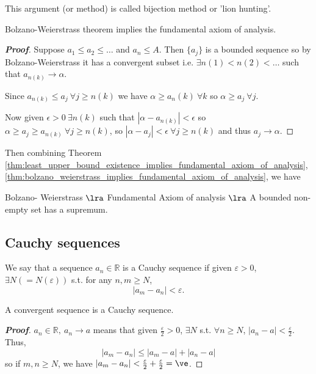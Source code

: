 \begin{remark}
This argument (or method) is called bijection method or 'lion hunting'.
\end{remark}

\begin{theorem}\label{thm:bolzano_weierstrass_implies_fundamental_axiom_of_analysis}
Bolzano-Weierstrass theorem implies the fundamental axiom of analysis.
\end{theorem}

\begin{proof}[\bf Proof]
Suppose $a_1 \leq a_2 \leq \ldots$ and $a_n \leq A$. Then $\{a_j\}$ is a bounded sequence so by Bolzano-Weierstrass it has a convergent subset i.e. $\exists n(1) < n(2) < \ldots$ such that $a_{n(k)} \rightarrow \alpha$.

Since $a_{n(k)} \leq a_j \ \forall j \geq n(k)$ we have $\alpha \geq a_n(k) \ \forall k$ so $\alpha \geq a_j \ \forall j$.

Now given $\epsilon > 0 \ \exists n(k)$ such that $|\alpha - a_{n(k)}| < \epsilon$ so $\alpha \geq a_j \geq a_{n(k)} \ \forall j \geq n(k)$, so $|\alpha - a_j| < \epsilon \ \forall j \geq n(k)$ and thus $a_j \rightarrow \alpha$.
\end{proof}

Then combining Theorem \ref{thm:least_upper_bound_existence_implies_fundamental_axiom_of_analysis}, \ref{thm:bolzano_weierstrass_implies_fundamental_axiom_of_analysis}, we have
\begin{theorem}
Bolzano- Weierstrass $\lra$ Fundamental Axiom of analysis $\lra$ A bounded non-empty set has a supremum.
\end{theorem}


\subsection{Cauchy sequences}

\begin{definition}
We say that a sequence $a_n\in \mathbb{R}$ is a Cauchy sequence if given $\varepsilon>0$, $\exists N(=N(\varepsilon))$ s.t. for any $n,m\geq N$,
\begin{equation*}
|a_m-a_n|<\varepsilon.
\end{equation*}
\end{definition}

\begin{lemma}
A convergent sequence is a Cauchy sequence.
\end{lemma}
\begin{proof}[{\bf Proof}]
$a_n\in\mathbb{R}, \ a_n\to a$ means that given $\frac{\varepsilon}{2}>0$, $\exists N$ s.t. $\forall n\geq N$, $|a_n-a|<\frac{\varepsilon}{2}$. Thus,
\begin{equation*}
|a_m-a_n|\leq |a_m-a| + |a_n-a|
\end{equation*}
so if $m,n\geq N$, we have $|a_m-a_n| < \frac{\varepsilon}{2} + \frac{\varepsilon}{2} = \ve$.
\end{proof}

